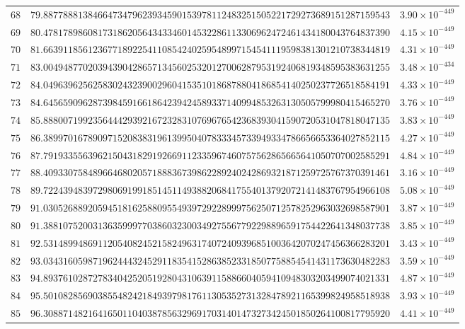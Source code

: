 \documentclass[12pt,reqno]{amsart}
\theoremstyle{remark}
\begin{document}
\begin{longtable}{clc}
$68$ & $79.8877888138466473479623934590153978112483251505221729273689151287159543$ & $3.90\times 10^{-449}$ \\
$69$ & $80.4781789860817318620564343346014532286113306962472461434180043764837390$ & $4.15\times 10^{-449}$ \\
$70$ & $81.6639118561236771892254110854240259548997154541119598381301210738344819$ & $4.31\times 10^{-449}$ \\
$71$ & $83.0049487702039439042865713456025320127006287953192406819348595383631255$ & $3.48\times 10^{-434}$ \\
$72$ & $84.0496396256258302432390029604153510186878804186854140250237726518584191$ & $4.33\times 10^{-449}$ \\
$73$ & $84.6456590962873984591661864239424589337140994853263130505799980415465270$ & $3.76\times 10^{-449}$ \\
$74$ & $85.8880071992356444293921672328310769676542368393041590720531047818047135$ & $3.83\times 10^{-449}$ \\
$75$ & $86.3899701678909715208383196139950407833345733949334786656653364027852115$ & $4.27\times 10^{-449}$ \\
$76$ & $87.7919335563962150431829192669112335967460757562865665641050707002585291$ & $4.84\times 10^{-449}$ \\
$77$ & $88.4093307584896646802057188836739862289240242869321871259725767370391461$ & $3.16\times 10^{-449}$ \\
$78$ & $89.7224394839729806919918514511493882068417554013792072141483767954966108$ & $5.08\times 10^{-449}$ \\
$79$ & $91.0305268892059451816258809554939729228999756250712578252963032698587901$ & $3.87\times 10^{-449}$ \\
$80$ & $91.3881075200313635999770386032300349275567792298896591754422641348037738$ & $3.85\times 10^{-449}$ \\
$81$ & $92.5314899486911205408245215824963174072409396851003642070247456366283201$ & $3.43\times 10^{-449}$ \\
$82$ & $93.0343160598719624443245291183541528638523318507758854541431173630482283$ & $3.59\times 10^{-449}$ \\
$83$ & $94.8937610287278340425205192804310639115886604059410948303203499074021331$ & $4.87\times 10^{-449}$ \\
$84$ & $95.5010828569038554824218493979817611305352731328478921165399824958518938$ & $3.93\times 10^{-449}$ \\
$85$ & $96.3088714821641650110403878563296917031401473273424501850264100817795920$ & $4.41\times 10^{-449}$ \\

\end{longtable}
\end{document}
